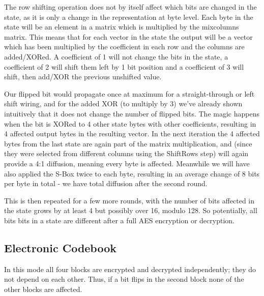 \documentclass{article}
\begin{document}
The row shifting operation does not by itself affect which bits are changed in the state, as it is only a change in the representation at byte level.
Each byte in the state will be an element in a matrix which is multiplied by the mixcolumns matrix.
This means that for each vector in the state the output will be a vector which has been multiplied by the coefficient in each row and the columns are added/XORed.
A coefficient of 1 will not change the bits in the state, a coefficient of 2 will shift them left by 1 bit position and a coefficient of 3 will shift, then add/XOR the previous unshifted value.

Our flipped bit would propagate once at maximum for a straight-through or left shift wiring, and for the added XOR (to multiply by 3) we've already shown intuitively that it does not change the number of flipped bits.
The magic happens when the bit is XORed to 4 other state bytes with other coefficients, resulting in 4 affected output bytes in the resulting vector.
In the next iteration the 4 affected bytes from the last state are again part of the matrix multiplication, and (since they were selected from different columns using the ShiftRows step) will again provide a 4:1 diffusion, meaning every byte is affected.
Meanwhile we will have also applied the S-Box twice to each byte, resulting in an average change of 8 bits per byte in total - we have total diffusion after the second round.

This is then repeated for a few more rounds, with the number of bits affected in the state grows by at least 4 but possibly over 16, modulo 128.
So potentially, all bits bits in a state are different after a full AES encryption or decryption.


\subsection{Electronic Codebook}
In this mode all four blocks are encrypted and decrypted independently; they do not depend on each other.
Thus, if a bit flips in the second block none of the other blocks are affected.

\end{document}
